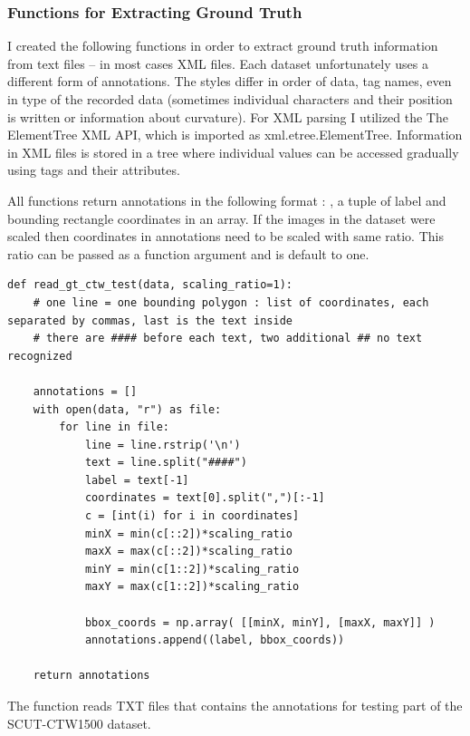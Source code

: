 \subsubsection*{Functions for Extracting Ground Truth}

I created the following functions in order to extract ground truth information from  text files -- in most cases XML files. Each dataset unfortunately uses a different form of annotations. The styles differ in order of data, tag names, even in type of the recorded data (sometimes individual characters and their position is written or information about curvature). For XML parsing I utilized the The ElementTree XML API, which is imported as xml.etree.ElementTree. Information in XML files is stored in a tree where individual values can be accessed gradually using tags and their attributes.

All functions return annotations in the following format :
\newline {}, a tuple of label and bounding rectangle coordinates in an array. 
If the images in the dataset were scaled then coordinates in annotations need to be scaled with same ratio. This ratio can be passed as a function argument and is default to one.

\begin{lstlisting}[caption=read\_gt\_ctw\_test]
def read_gt_ctw_test(data, scaling_ratio=1):
    # one line = one bounding polygon : list of coordinates, each separated by commas, last is the text inside 
    # there are #### before each text, two additional ## no text recognized

    annotations = []
    with open(data, "r") as file:
        for line in file:
            line = line.rstrip('\n')
            text = line.split("####")
            label = text[-1]
            coordinates = text[0].split(",")[:-1]
            c = [int(i) for i in coordinates]
            minX = min(c[::2])*scaling_ratio
            maxX = max(c[::2])*scaling_ratio
            minY = min(c[1::2])*scaling_ratio
            maxY = max(c[1::2])*scaling_ratio

            bbox_coords = np.array( [[minX, minY], [maxX, maxY]] )
            annotations.append((label, bbox_coords))

    return annotations
\end{lstlisting}

The function  reads TXT files that contains the annotations for testing part of the SCUT-CTW1500 dataset.


